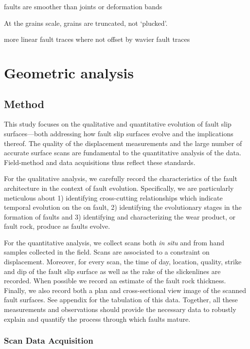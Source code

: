 \documentclass[12pt,a4paper]{article}
\begin{document}
faults are smoother than joints or deformation bands

At the grains scale, grains are truncated, not `plucked'.

more linear fault traces where not offset by wavier fault traces
	
\section{Geometric analysis}		

\subsection{Method}

This study focuses on the qualitative and quantitative evolution of fault slip surfaces—both addressing how fault slip surfaces evolve and the implications thereof. The quality of the displacement measurements and the large number of accurate surface scans are fundamental to the quantitative analysis of the data. Field-method and data acquisitions thus reflect these standards. 

For the qualitative analysis, we carefully record the characteristics of the fault architecture in the context of fault evolution. Specifically, we are particularly meticulous about 1) identifying cross-cutting relationships which indicate temporal evolution on the on fault, 2) identifying the evolutionary stages in the formation of faults and 3) identifying and characterizing the wear product, or fault rock, produce as faults evolve. 

For the quantitative analysis, we collect scans both \textit{in situ} and from hand samples collected in the field. Scans are associated to a constraint on displacement. Moreover, for every scan, the time of day, location, quality, strike and dip of the fault slip surface as well as the rake of the slickenlines are recorded. When possible we record an estimate of the fault rock thickness. Finally, we also record both a plan and cross-sectional view image of the scanned fault surfaces.  See appendix for the tabulation of this data. Together, all these measurements and observations should provide the necessary data to robustly explain and quantify the process through which faults mature.

	\subsubsection{Scan Data Acquisition}
\end{document}
